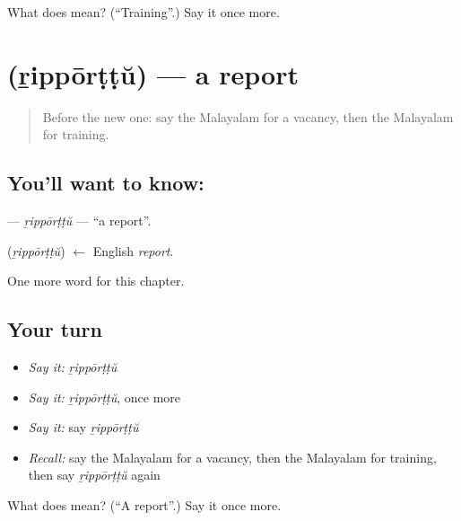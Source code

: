 \begin{tcolorbox}[breakable,colback=teal!4,colframe=teal!35!black,title={Before you move on}]
What does  mean? (\textquotedblleft{}Training\textquotedblright{}.) Say it once more.
\end{tcolorbox}
\section[\texorpdfstring{\ml{റിപ്പോർട്ട്} (ṟippōrṭṭŭ)}{റിപ്പോർട്ട് (ṟippōrṭṭŭ)}]{ (ṟippōrṭṭŭ) — a report}

\label{lesson:ML-C261-ripporttu}



\begin{quote}
Before the new one: say the Malayalam for a vacancy, then the Malayalam for training.
\end{quote}

\subsection*{You'll want to know: }
\textbf{} — \emph{ṟippōrṭṭŭ} — \textquotedblleft{}a report\textquotedblright{}.

\begin{cousinweb}
\textbf{} (\emph{ṟippōrṭṭŭ}) $\leftarrow$ English \emph{report}.
\end{cousinweb}

\begin{grammarlens}[title={What you've built}]
One more word for this chapter.
\end{grammarlens}

\subsection*{Your turn}
\begin{itemize}
\raggedright
  \item \emph{Say it:} \emph{ṟippōrṭṭŭ}
  \item \emph{Say it:} \emph{ṟippōrṭṭŭ}, once more
  \item \emph{Say it:} say \emph{ṟippōrṭṭŭ}
  \item \emph{Recall:} say the Malayalam for a vacancy, then the Malayalam for training, then say \emph{ṟippōrṭṭŭ} again
\end{itemize}

\begin{tcolorbox}[breakable,colback=teal!4,colframe=teal!35!black,title={Before you move on}]
What does  mean? (\textquotedblleft{}A report\textquotedblright{}.) Say it once more.
\end{tcolorbox}
